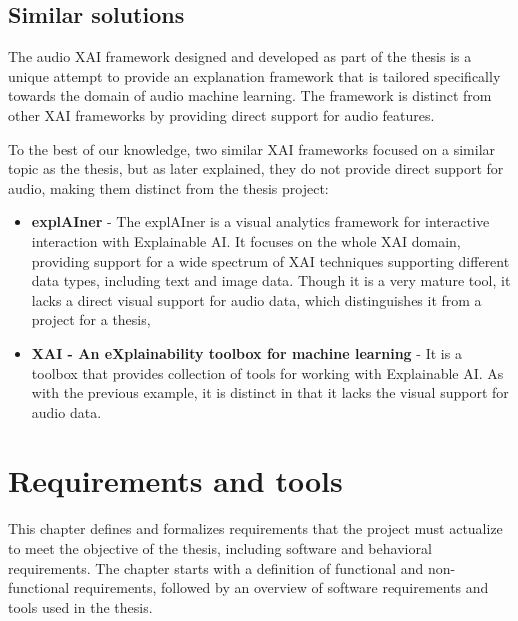 \documentclass[
    bindingoffset=5mm,  %
    footnoteindent=3mm, %
    hyphenation=true    %
]{src/wut-thesis}
\begin{document}
\subsection{Similar solutions}

The audio XAI framework designed and developed as part of the thesis is a unique attempt
to provide an explanation framework that is tailored specifically towards the domain of
audio machine learning. The framework is distinct from other XAI frameworks by providing
direct support for audio features.

To the best of our knowledge, two similar XAI frameworks focused on a similar topic as the thesis,
but as later explained, they do not provide direct support for audio, making them distinct from
the thesis project:
\begin{itemize}
    \item \textbf{explAIner} - The explAIner \cite{Spinner2019-jg} is a visual analytics framework
        for interactive interaction with Explainable AI. It focuses on the whole XAI domain, providing
        support for a wide spectrum of XAI techniques supporting different data types, including text and
        image data. Though it is a very mature tool, it lacks a direct visual support for audio data,
        which distinguishes it from a project for a thesis,
    \item \textbf{XAI - An eXplainability toolbox for machine learning} - It is a toolbox \cite{SomeXaiFramework}
        that provides collection of tools for working with Explainable AI. As with the previous example,
        it is distinct in that it lacks the visual support for audio data.
\end{itemize}

%
%
\clearpage %
\section{Requirements and tools} \label{ch:reqrTools}

        This chapter defines and formalizes requirements that the project must actualize
    to meet the objective of the thesis, including software and behavioral requirements.
    The chapter starts with a definition of functional and non-functional requirements,
    followed by an overview of software requirements and tools used in the thesis.
\end{document}
